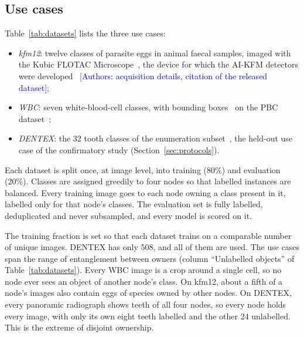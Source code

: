 \documentclass[pdflatex,sn-mathphys-num]{sn-jnl}
\newcommand{\authornote}[1]{\textcolor{blue}{[Authors: #1]}}
\begin{document}
\subsection{Use cases}\label{sec:usecases}
Table~\ref{tab:datasets} lists the three use cases:
\begin{itemize}
\item \emph{kfm12}: twelve classes of parasite eggs in animal faecal samples, imaged with the Kubic FLOTAC Microscope~\cite{cringoli2021kfm}, the device for which the AI-KFM detectors were developed~\cite{capuozzo2024aikfm,capuozzo2026ijp} \authornote{acquisition details, citation of the released dataset};
\item \emph{WBC}: seven white-blood-cell classes, with bounding boxes~\cite{wbcdetection} on the PBC dataset~\cite{acevedo2020pbc};
\item \emph{DENTEX}: the 32 tooth classes of the enumeration subset~\cite{hamamci2023dentex}, the held-out use case of the confirmatory study (Section~\ref{sec:protocols}).
\end{itemize}

Each dataset is split once, at image level, into training (80\%) and evaluation (20\%). Classes are assigned greedily to four nodes so that labelled instances are balanced. Every training image goes to each node owning a class present in it, labelled only for that node's classes. The evaluation set is fully labelled, deduplicated and never subsampled, and every model is scored on it.

The training fraction is set so that each dataset trains on a comparable number of unique images. DENTEX has only 508, and all of them are used. The use cases span the range of entanglement between owners (column ``Unlabelled objects'' of Table~\ref{tab:datasets}). Every WBC image is a crop around a single cell, so no node ever sees an object of another node's class. On kfm12, about a fifth of a node's images also contain eggs of species owned by other nodes. On DENTEX, every panoramic radiograph shows teeth of all four nodes, so every node holds every image, with only its own eight teeth labelled and the other 24 unlabelled. This is the extreme of disjoint ownership.
\end{document}
